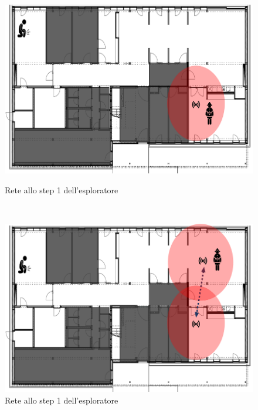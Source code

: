 \begin{figure}[h]
	\begin{minipage}[b]{6cm}
		\centering
		\includegraphics[scale=0.35]{Introduzione/intervento_step_1.png}
		\caption{Rete allo step 1 dell'esploratore}
		\label{fig:step1}
	\end{minipage}
	\ \hspace{10 mm} \
	\begin{minipage}[b]{6cm}
		\centering
		\includegraphics[scale=0.35]{Introduzione/intervento_step_2.png}
		\caption{Rete allo step 1 dell'esploratore}
		\label{fig:step2}
	\end{minipage}
\end{figure}


